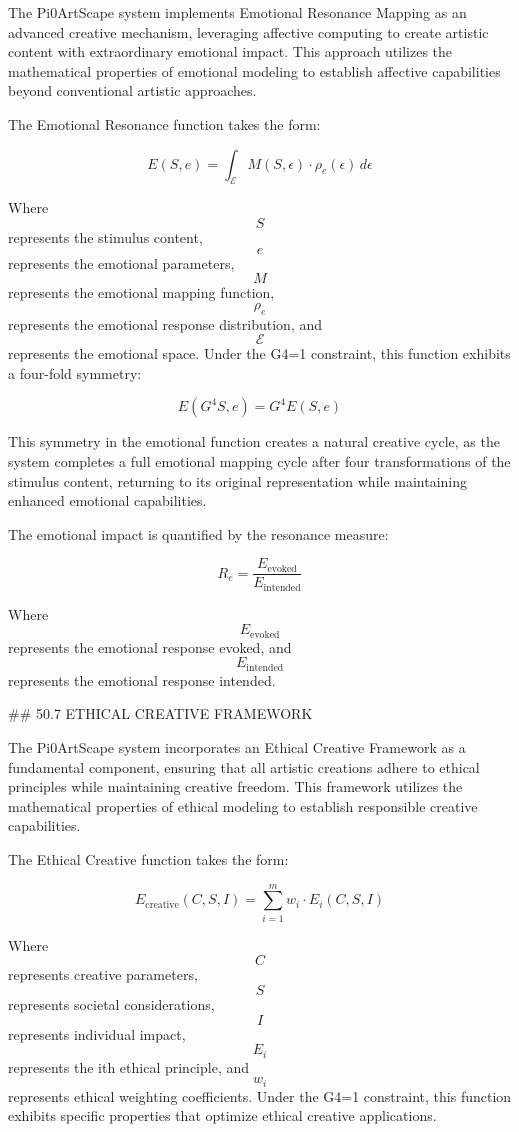 The Pi0ArtScape system implements Emotional Resonance Mapping as an advanced creative mechanism, leveraging affective computing to create artistic content with extraordinary emotional impact. This approach utilizes the mathematical properties of emotional modeling to establish affective capabilities beyond conventional artistic approaches.

The Emotional Resonance function takes the form:

$$ E(S, e) = \int_{\mathcal{E}} M(S, \epsilon) \cdot \rho_e(\epsilon) \, d\epsilon $$

Where $$ S $$ represents the stimulus content, $$ e $$ represents the emotional parameters, $$ M $$ represents the emotional mapping function, $$ \rho_e $$ represents the emotional response distribution, and $$ \mathcal{E} $$ represents the emotional space. Under the G4=1 constraint, this function exhibits a four-fold symmetry:

$$ E(G^4 S, e) = G^4 E(S, e) $$

This symmetry in the emotional function creates a natural creative cycle, as the system completes a full emotional mapping cycle after four transformations of the stimulus content, returning to its original representation while maintaining enhanced emotional capabilities.

The emotional impact is quantified by the resonance measure:

$$ R_e = \frac{E_{\text{evoked}}}{E_{\text{intended}}} $$

Where $$ E_{\text{evoked}} $$ represents the emotional response evoked, and $$ E_{\text{intended}} $$ represents the emotional response intended.

## 50.7 ETHICAL CREATIVE FRAMEWORK

The Pi0ArtScape system incorporates an Ethical Creative Framework as a fundamental component, ensuring that all artistic creations adhere to ethical principles while maintaining creative freedom. This framework utilizes the mathematical properties of ethical modeling to establish responsible creative capabilities.

The Ethical Creative function takes the form:

$$ E_{\text{creative}}(C, S, I) = \sum_{i=1}^m w_i \cdot E_i(C, S, I) $$

Where $$ C $$ represents creative parameters, $$ S $$ represents societal considerations, $$ I $$ represents individual impact, $$ E_i $$ represents the ith ethical principle, and $$ w_i $$ represents ethical weighting coefficients. Under the G4=1 constraint, this function exhibits specific properties that optimize ethical creative applications.

